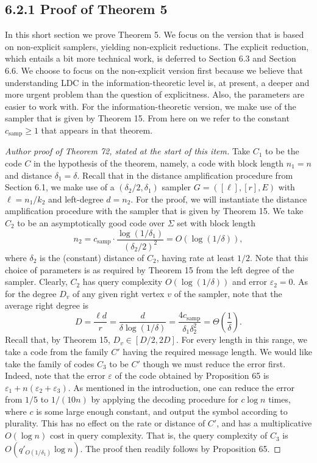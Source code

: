 \subsection*{6.2.1 Proof of Theorem 5}
In this short section we prove Theorem 5. We focus on the version that is based on non-explicit samplers, yielding non-explicit reductions. The explicit reduction, which entails a bit more technical work, is deferred to Section 6.3 and Section 6.6. We choose to focus on the non-explicit version first because we believe that understanding LDC in the information-theoretic level is, at present, a deeper and more urgent problem than the question of explicitness. Also, the parameters are easier to work with. For the information-theoretic version, we make use of the sampler that is given by Theorem 15. From here on we refer to the constant $c_{\mathrm{samp}}\geq1$ that appears in that theorem.
\begin{proof}[Author proof of Theorem 72, stated at the start of this item]
Take $C_1$ to be the code $C$ in the hypothesis of the theorem, namely, a code with block length $n_1=n$ and distance $\delta_1=\delta$. Recall that in the distance amplification procedure from Section 6.1, we make use of a $(\delta_2/2,\delta_1)$ sampler $G=([\ell],[r],E)$ with $\ell=n_1/k_2$ and left-degree $d=n_2$. For the proof, we will instantiate the distance amplification procedure with the sampler that is given by Theorem 15. We take $C_2$ to be an asymptotically good code over $\Sigma$ set with block length
\[n_2=c_{\mathrm{samp}}\cdot\frac{\log(1/\delta_1)}{(\delta_2/2)^2}=O(\log(1/\delta)),\]
where $\delta_2$ is the (constant) distance of $C_2$, having rate at least $1/2$. Note that this choice of parameters is as required by Theorem 15 from the left degree of the sampler. Clearly, $C_2$ has query complexity $O(\log(1/\delta))$ and error $\varepsilon_2=0$. As for the degree $D_v$ of any given right vertex $v$ of the sampler, note that the average right degree is
\[D=\frac{\ell d}{r}=\frac d{\delta\log(1/\delta)}=\frac{4c_{\mathrm{samp}}}{\delta_1\delta_2^2}=\Theta\left(\frac1\delta\right).\]
Recall that, by Theorem 15, $D_v\in[D/2,2D]$. For every length in this range, we take a code from the family $C'$ having the required message length. We would like take the family of codes $C_3$ to be $C'$ though we must reduce the error first. Indeed, note that the error $\varepsilon$ of the code obtained by Proposition 65 is $\varepsilon_1+n(\varepsilon_2+\varepsilon_3)$. As mentioned in the introduction, one can reduce the error from $1/5$ to $1/(10n)$ by applying the decoding procedure for $c\log n$ times, where $c$ is some large enough constant, and output the symbol according to plurality. This has no effect on the rate or distance of $C'$, and has a multiplicative $O(\log n)$ cost in query complexity. That is, the query complexity of $C_3$ is $O(q'_{O(1/\delta_1)}\log n)$. The proof then readily follows by Proposition 65.
\end{proof}
